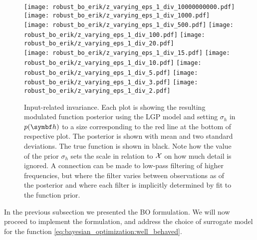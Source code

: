 \begin{figure}[t]
    \centering
    \texttt{[image: robust\_bo\_erik/z\_varying\_eps\_1\_div\_10000000000.pdf]}
    \texttt{[image: robust\_bo\_erik/z\_varying\_eps\_1\_div\_1000.pdf]}
    \texttt{[image: robust\_bo\_erik/z\_varying\_eps\_1\_div\_500.pdf]}
    \texttt{[image: robust\_bo\_erik/z\_varying\_eps\_1\_div\_100.pdf]}
    \texttt{[image: robust\_bo\_erik/z\_varying\_eps\_1\_div\_20.pdf]}\\
    \hspace{-0.01cm}
    \texttt{[image: robust\_bo\_erik/z\_varying\_eps\_1\_div\_15.pdf]}
    \texttt{[image: robust\_bo\_erik/z\_varying\_eps\_1\_div\_10.pdf]}
    \texttt{[image: robust\_bo\_erik/z\_varying\_eps\_1\_div\_5.pdf]}
    \texttt{[image: robust\_bo\_erik/z\_varying\_eps\_1\_div\_3.pdf]}
    \texttt{[image: robust\_bo\_erik/z\_varying\_eps\_1\_div\_2.pdf]}
    \caption{
        \label{fig:bayesian_optimization:varying_z_sigma}
        Input-related invariance.
        Each plot is showing the resulting modulated function posterior using the LGP model and setting $\sigma_h$ in $p(\mat{h})$ to a size corresponding to the
        red line at the bottom of respective plot.
        The posterior is shown with mean and two standard deviations.
        The true function is shown in black.
        Note how the value of the prior $\sigma_h$ sets the scale in relation to $\mathcal{X}$ on how much detail is ignored.
        A connection can be made to low-pass filtering of higher frequencies, but where the filter varies between observations as of the posterior and where each filter is implicitly determined
        by fit to the function prior.
    }
\end{figure}

In the previous subsection we presented the BO formulation.
We will now proceed to implement the formulation, and address the choice of surrogate model for the function \cref{eq:bayesian_optimization:well_behaved}.

